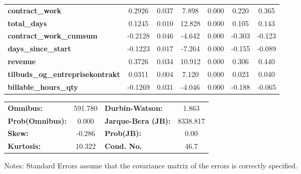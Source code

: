 \begin{center}
\begin{tabular}{lcccccc}
\textbf{contract\_work}                  &       0.2926  &        0.037     &     7.898  &         0.000        &        0.220    &        0.365     \\
\textbf{total\_days}                     &       0.1245  &        0.010     &    12.828  &         0.000        &        0.105    &        0.143     \\
\textbf{contract\_work\_cumsum}          &      -0.2128  &        0.046     &    -4.642  &         0.000        &       -0.303    &       -0.123     \\
\textbf{days\_since\_start}              &      -0.1223  &        0.017     &    -7.264  &         0.000        &       -0.155    &       -0.089     \\
\textbf{revenue}                         &       0.3726  &        0.034     &    10.912  &         0.000        &        0.306    &        0.440     \\
\textbf{tilbuds\_og\_entreprisekontrakt} &       0.0311  &        0.004     &     7.120  &         0.000        &        0.023    &        0.040     \\
\textbf{billable\_hours\_qty}            &      -0.1269  &        0.031     &    -4.046  &         0.000        &       -0.188    &       -0.065     \\
\bottomrule
\end{tabular}
\begin{tabular}{lclc}
\textbf{Omnibus:}       & 591.780 & \textbf{  Durbin-Watson:     } &    1.863  \\
\textbf{Prob(Omnibus):} &   0.000 & \textbf{  Jarque-Bera (JB):  } & 8338.817  \\
\textbf{Skew:}          &  -0.286 & \textbf{  Prob(JB):          } &     0.00  \\
\textbf{Kurtosis:}      &  10.322 & \textbf{  Cond. No.          } &     46.7  \\
\bottomrule
\end{tabular}
\end{center}

Notes: \newline
 [1] Standard Errors assume that the covariance matrix of the errors is correctly specified.